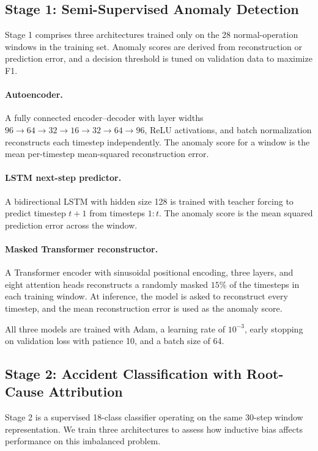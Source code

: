 \subsection{Stage 1: Semi-Supervised Anomaly Detection}
\label{sec:anomaly}

Stage 1 comprises three architectures trained only on the 28 normal-operation windows in the training set. Anomaly scores are derived from reconstruction or prediction error, and a decision threshold is tuned on validation data to maximize F1.

\paragraph{Autoencoder.} A fully connected encoder--decoder with layer widths $96 \rightarrow 64 \rightarrow 32 \rightarrow 16 \rightarrow 32 \rightarrow 64 \rightarrow 96$, ReLU activations, and batch normalization reconstructs each timestep independently. The anomaly score for a window is the mean per-timestep mean-squared reconstruction error.

\paragraph{LSTM next-step predictor.} A bidirectional LSTM with hidden size 128 is trained with teacher forcing to predict timestep $t+1$ from timesteps $1{:}t$. The anomaly score is the mean squared prediction error across the window.

\paragraph{Masked Transformer reconstructor.} A Transformer encoder with sinusoidal positional encoding, three layers, and eight attention heads reconstructs a randomly masked $15\%$ of the timesteps in each training window. At inference, the model is asked to reconstruct every timestep, and the mean reconstruction error is used as the anomaly score.

All three models are trained with Adam, a learning rate of $10^{-3}$, early stopping on validation loss with patience 10, and a batch size of 64.

\subsection{Stage 2: Accident Classification with Root-Cause Attribution}
\label{sec:classifier}

Stage 2 is a supervised 18-class classifier operating on the same 30-step window representation. We train three architectures to assess how inductive bias affects performance on this imbalanced problem.

